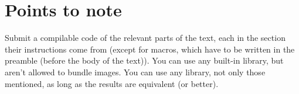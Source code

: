 \documentclass[a4paper,beeees]{hwhProblem}
\begin{document}
\section*{Points to note}
Submit a compilable \LaTeXe{} code of the relevant parts of the text, each in the section their instructions come from (except for macros, which have to be written in the preamble (before the body of the text)). You can use any built-in library, but aren't allowed to bundle images. You can use any library, not only those mentioned, as long as the results are equivalent (or better).
\end{document}
